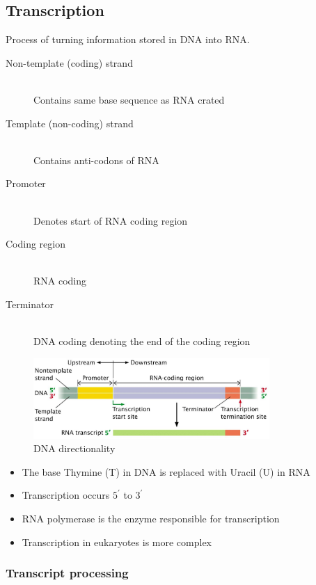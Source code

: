 \documentclass[a4paper]{article}
\begin{document}
\subsection{Transcription}

Process of turning information stored in DNA into RNA.

\begin{description}
  \item[Non-template (coding) strand] \hfill \\
    Contains same base sequence as RNA crated
  \item[Template (non-coding) strand] \hfill \\
    Contains anti-codons of RNA
  \item[Promoter] \hfill \\
    Denotes start of RNA coding region
  \item[Coding region] \hfill \\
    RNA coding
  \item[Terminator] \hfill \\
    DNA coding denoting the end of the coding region
\end{description}

\begin{figure}[h!]
  \centering
  \includegraphics[width=0.8\textwidth]{graphics/dna-rna_transcription.eps}
  \caption{DNA directionality}
  \label{fig:dna-rna_transcription}
\end{figure}
\FloatBarrier

\begin{itemize}
  \item The base Thymine (T) in DNA is replaced with Uracil (U) in RNA
  \item Transcription occurs $5^{\prime}$ to $3^{\prime}$
  \item RNA polymerase is the enzyme responsible for transcription
  \item Transcription in eukaryotes is more complex
\end{itemize}

\subsubsection{Transcript processing}
\end{document}
